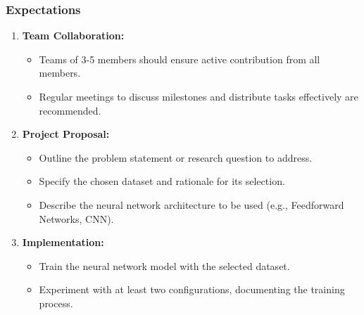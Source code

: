 \documentclass[aspectratio=169]{beamer}
\begin{document}
\begin{frame}
    \frametitle{Expectations}
    \begin{enumerate}
        \item \textbf{Team Collaboration:}
        \begin{itemize}
            \item Teams of 3-5 members should ensure active contribution from all members.
            \item Regular meetings to discuss milestones and distribute tasks effectively are recommended.
        \end{itemize}
        
        \item \textbf{Project Proposal:}
        \begin{itemize}
            \item Outline the problem statement or research question to address.
            \item Specify the chosen dataset and rationale for its selection.
            \item Describe the neural network architecture to be used (e.g., Feedforward Networks, CNN).
        \end{itemize}

        \item \textbf{Implementation:}
        \begin{itemize}
            \item Train the neural network model with the selected dataset.
            \item Experiment with at least two configurations, documenting the training process.
        \end{itemize}
    \end{enumerate}
\end{frame}
\end{document}
